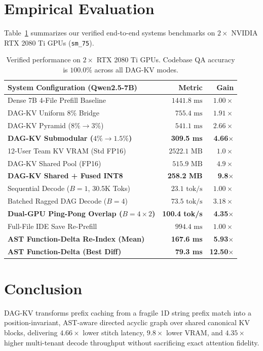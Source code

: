 \documentclass[10pt,twocolumn]{article}
\begin{document}
\section{Empirical Evaluation}
Table~\ref{tab:main_results} summarizes our verified end-to-end systems benchmarks on $2\times$ NVIDIA RTX 2080 Ti GPUs (\texttt{sm\_75}).

\begin{table}[h]
\centering
\small
\begin{tabular}{lrr}
\toprule
\textbf{System Configuration (Qwen2.5-7B)} & \textbf{Metric} & \textbf{Gain} \\
\midrule
Dense 7B 4-File Prefill Baseline & $1441.8\text{ ms}$ & $1.00\times$ \\
DAG-KV Uniform $8\%$ Bridge & $755.4\text{ ms}$ & $1.91\times$ \\
DAG-KV Pyramid ($8\% \to 3\%$) & $541.1\text{ ms}$ & $2.66\times$ \\
\textbf{DAG-KV Submodular ($4\% \to 1.5\%$)} & \textbf{309.5 ms} & \textbf{4.66$\times$} \\
\midrule
12-User Team KV VRAM (Std FP16) & $2522.1\text{ MB}$ & $1.0\times$ \\
DAG-KV Shared Pool (FP16) & $515.9\text{ MB}$ & $4.9\times$ \\
\textbf{DAG-KV Shared + Fused INT8} & \textbf{258.2 MB} & \textbf{9.8$\times$} \\
\midrule
Sequential Decode ($B=1$, 30.5K Toks) & $23.1\text{ tok/s}$ & $1.00\times$ \\
Batched Ragged DAG Decode ($B=4$) & $73.5\text{ tok/s}$ & $3.18\times$ \\
\textbf{Dual-GPU Ping-Pong Overlap ($B=4\times 2$)} & \textbf{100.4 tok/s} & \textbf{4.35$\times$} \\
\midrule
Full-File IDE Save Re-Prefill & $994.4\text{ ms}$ & $1.00\times$ \\
\textbf{AST Function-Delta Re-Index (Mean)} & \textbf{167.6 ms} & \textbf{5.93$\times$} \\
\textbf{AST Function-Delta (Best Diff)} & \textbf{79.3 ms} & \textbf{12.50$\times$} \\
\bottomrule
\end{tabular}
\caption{Verified performance on $2\times$ RTX 2080 Ti GPUs. Codebase QA accuracy is $100.0\%$ across all DAG-KV modes.}
\label{tab:main_results}
\end{table}

\section{Conclusion}
DAG-KV transforms prefix caching from a fragile 1D string prefix match into a position-invariant, AST-aware directed acyclic graph over shared canonical KV blocks, delivering $4.66\times$ lower stitch latency, $9.8\times$ lower VRAM, and $4.35\times$ higher multi-tenant decode throughput without sacrificing exact attention fidelity.
\end{document}
